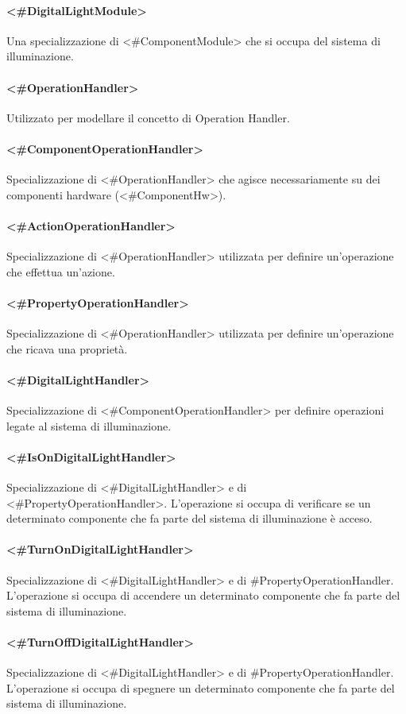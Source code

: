 \paragraph{<\#DigitalLightModule>}
Una specializzazione di <\#ComponentModule> che si occupa del sistema di illuminazione.
\paragraph{<\#OperationHandler>}
Utilizzato per modellare il concetto di Operation Handler.
\paragraph{<\#ComponentOperationHandler>}
Specializzazione di <\#OperationHandler> che agisce necessariamente su dei componenti hardware (<\#ComponentHw>).
\paragraph{<\#ActionOperationHandler>}
Specializzazione di <\#OperationHandler> utilizzata per definire un'operazione che effettua un'azione.
\paragraph{<\#PropertyOperationHandler>}
Specializzazione di <\#OperationHandler> utilizzata per definire un'operazione che ricava una proprietà.
\paragraph{<\#DigitalLightHandler>}
Specializzazione di <\#ComponentOperationHandler> per definire operazioni legate al sistema di illuminazione.
\paragraph{<\#IsOnDigitalLightHandler>}
Specializzazione di <\#DigitalLightHandler> e di <\#PropertyOperationHandler>. L'operazione si occupa di verificare se un determinato componente che fa parte del sistema di illuminazione è acceso.
\paragraph{<\#TurnOnDigitalLightHandler>}
Specializzazione di <\#DigitalLightHandler> e di \#PropertyOperationHandler. L'operazione si occupa di accendere un determinato componente che fa parte del sistema di illuminazione.
\paragraph{<\#TurnOffDigitalLightHandler>}
Specializzazione di <\#DigitalLightHandler> e di \#PropertyOperationHandler. L'operazione si occupa di spegnere un determinato componente che fa parte del sistema di illuminazione.
